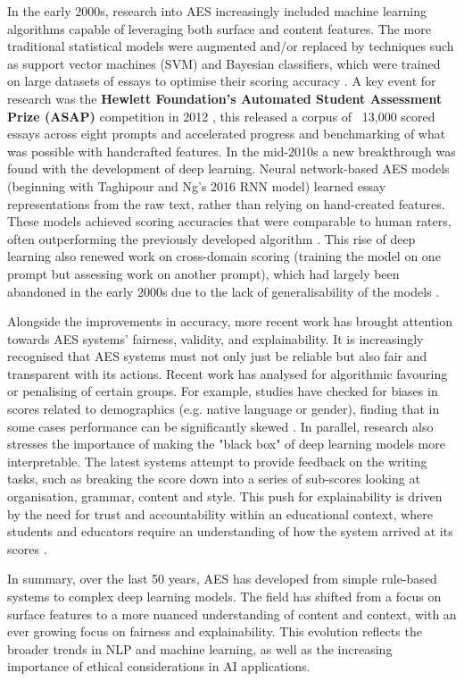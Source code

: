 \documentclass[12pt,a4paper]{report}
\begin{document}
In the early 2000s, research into AES increasingly included machine learning algorithms capable of leveraging both surface and content features. The more traditional statistical models were augmented and/or replaced by techniques such as support vector machines (SVM) and Bayesian classifiers, which were trained on large datasets of essays to optimise their scoring accuracy \citep{shermis2013handbook}. A key event for research was the \textbf{Hewlett Foundation’s Automated Student Assessment Prize (ASAP)} competition in 2012 \citep{asap2012kaggle},  this released a corpus of ~13,000 scored essays across eight prompts and accelerated progress and benchmarking of what was possible with handcrafted features. In the mid-2010s a new breakthrough was found with the development of deep learning. Neural network-based AES models (beginning with Taghipour and Ng's 2016 RNN model) learned essay representations from the raw text, rather than relying on hand-created features. These models achieved scoring accuracies that were comparable to human raters, often outperforming the previously developed algorithm \citep{taghipour2016neural}. This rise of deep learning also renewed work on cross-domain scoring (training the model on one prompt but assessing work on another prompt), which had largely been abandoned in the early 2000s due to the lack of generalisability of the models \citep{beigman2021narrative}.

Alongside the improvements in accuracy, more recent work has brought attention towards AES systems’ fairness, validity, and explainability. It is increasingly recognised that AES systems must not only just be reliable but also fair and transparent with its actions. Recent work has analysed for algorithmic favouring or penalising of certain groups. For example, studies have checked for biases in scores related to demographics (e.g. native language or gender), finding that in some cases performance can be significantly skewed \citep{blodgett2020language}. In parallel, research also stresses the importance of making the "black box" of deep learning models more interpretable. The latest systems attempt to provide feedback on the writing tasks, such as breaking the score down into a series of sub-scores looking at organisation, grammar, content and style. This push for explainability is driven by the need for trust and accountability within an educational context, where students and educators require an understanding of how the system arrived at its scores \citep{lundberg2017unified}.

In summary, over the last 50 years, AES has developed from simple rule-based systems to complex deep learning models. The field has shifted from a focus on surface features to a more nuanced understanding of content and context, with an ever growing focus on fairness and explainability. This evolution reflects the broader trends in NLP and machine learning, as well as the increasing importance of ethical considerations in AI applications.
\end{document}
